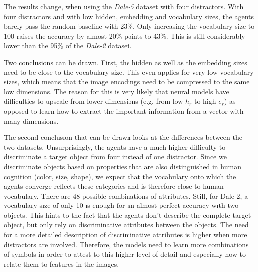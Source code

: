 The results change, when using the \emph{Dale-5} dataset with four distractors.
With four distractors and with low hidden, embedding and vocabulary sizes, the agents barely pass the random baseline with 23\%.
Only increasing the vocabulary size to 100 raises the accuracy by almost 20\% points to 43\%.
This is still considerably lower than the 95\% of the \emph{Dale-2} dataset.


Two conclusions can be drawn.
First, the hidden as well as the embedding sizes need to be close to the vocabulary size.
This even applies for very low vocabulary sizes, which means that the image encodings need to be compressed to the same low dimensions.
The reason for this is very likely that neural models have difficulties to upscale from lower dimensions (e.g. from low $h_r$ to high $e_r$) as opposed to learn how to extract the important information from a vector with many dimensions.

The second conclusion that can be drawn looks at the differences between the two datasets.
Unsurprisingly, the agents have a much higher difficulty to discriminate a target object from four instead of one distractor.
Since we discriminate objects based on properties that are also distinguished in human cognition (color, size, shape), we expect that the vocabulary onto which the agents converge reflects these categories and is therefore close to human vocabulary.
There are 48 possible combinations of attributes.
Still, for Dale-2, a vocabulary size of only 10 is enough for an almost perfect accuracy with two objects.
This hints to the fact that the agents don't describe the complete target object, but only rely on discriminative attributes between the objects.
The need for a more detailed description of discriminative attributes is higher when more distractors are involved.
Therefore, the models need to learn more combinations of symbols in order to attest to this higher level of detail and especially how to relate them to features in the images.


